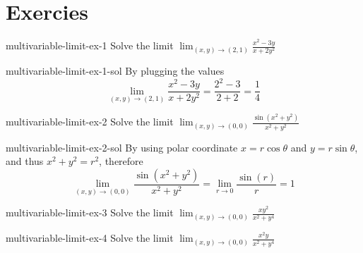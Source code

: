 \documentclass[preview]{standalone}
\begin{document}
\genpage

\section{Exercies}

\begin{snippetexercise}{multivariable-limit-ex-1}{}
Solve the limit \(\lim _{(x, y) \rightarrow(2,1)} \frac{x^2-3 y}{x+2 y^2}\)
\end{snippetexercise}

\begin{snippetsolution}{multivariable-limit-ex-1-sol}{}
By plugging the values \[
    \lim _{(x, y) \rightarrow(2,1)} \frac{x^2-3 y}{x+2 y^2}
    = \frac{2^2-3}{2+2} = \frac{1}{4}
\]
\end{snippetsolution}

\begin{snippetexercise}{multivariable-limit-ex-2}{}
Solve the limit \(\lim _{(x, y) \rightarrow(0,0)} \frac{\sin \left(x^2+y^2\right)}{x^2+y^2}\)
\end{snippetexercise}

\begin{snippetsolution}{multivariable-limit-ex-2-sol}{}
By using polar coordinate \(x=r\cos\theta\) and \(y=r\sin\theta\),
and thus \(x^2+y^2=r^2\), therefore
\[
    \lim_{(x, y) \rightarrow(0,0)} \frac{\sin \left(x^2+y^2\right)}{x^2+y^2}
    = \lim_{r \rightarrow 0} \frac{\sin \left(r\right)}{r}=1
\]
\end{snippetsolution}

\begin{snippetexercise}{multivariable-limit-ex-3}{}
Solve the limit \(\lim_{(x, y) \rightarrow(0,0)} \frac{x y^2}{x^2+y^4}\)
\end{snippetexercise}

\begin{snippetexercise}{multivariable-limit-ex-4}{}
Solve the limit \(\lim_{(x, y) \rightarrow(0,0)} \frac{x^2 y}{x^2+y^4}\)
\end{snippetexercise}
\end{document}
